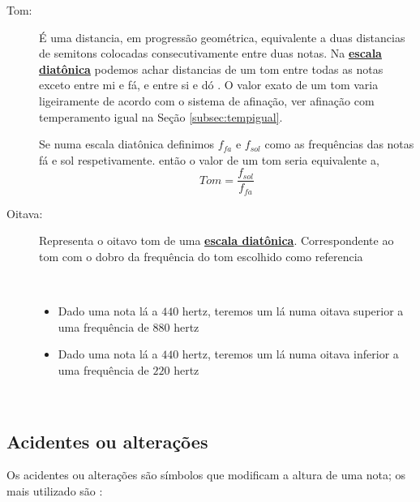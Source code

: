 \begin{description}
\item [Tom:] \label{sec:pos:TomDist}
É uma distancia, em progressão geométrica, equivalente a duas distancias de semitons colocadas consecutivamente entre duas notas.
Na \hyperref[sec:pos:Diatonica]{\textbf{escala diatônica}} podemos achar distancias de um tom entre todas as notas exceto entre mi e fá, e entre si e dó \cite[pp. 30]{cardoso1973curso}\cite[pp. 762]{apel1969harvard}.
O valor exato de um tom varia ligeiramente de acordo com o sistema de afinação, ver afinação com temperamento igual na Seção \ref{subsec:tempigual}. 
\begin{example}
Se numa escala diatônica definimos $f_{fa}$ e $f_{sol}$ como as frequências das notas fá e sol respetivamente.
então o valor de um tom seria equivalente a,
\begin{equation*}
Tom=\frac{f_{sol}}{f_{fa}}
\end{equation*}
\end{example}

\item [Oitava:] \label{sec:pos:Oitava}
Representa o oitavo tom de uma \hyperref[sec:pos:Diatonica]{\textbf{escala diatônica}}. 
Correspondente  ao tom com o dobro da frequência do tom escolhido como referencia \cite[pp. 589]{apel1969harvard}
\begin{example}~
\begin{itemize}
\item Dado uma nota lá a $440$ hertz, teremos um lá numa oitava superior a uma frequência de $880$ hertz  
\item Dado uma nota lá a $440$ hertz, teremos um lá numa oitava inferior a uma frequência de $220$ hertz  
\end{itemize}
\end{example}

\end{description}~\\

\subsection{Acidentes ou alterações}
\label{subsec:acidentes}


Os acidentes ou alterações são símbolos que modificam a altura de uma nota; 
os mais utilizado são \cite[pp. ]{alves2004teoria}:\\

